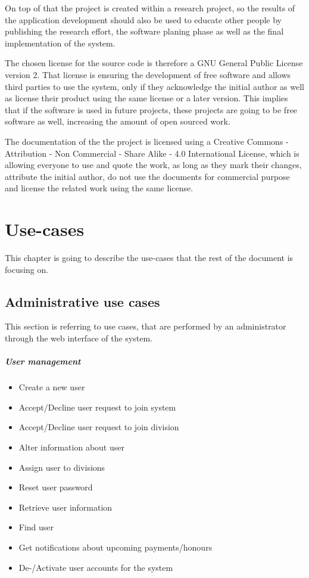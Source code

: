 On top of that the project is created within a research project, so the results of the application development should also be used to educate other people by publishing the research effort, the software planing phase as well as the final implementation of the system.

The chosen license for the source code is therefore a GNU General Public License version 2. That license is ensuring the development of free software and allows third parties to use the system, only if they acknowledge the initial author as well as license their product using the same license or a later version. This implies that if the software is used in future projects, these projects are going to be free software as well, increasing the amount of open sourced work.

The documentation of the the project is licensed using a Creative Commons - Attribution - Non Commercial - Share Alike - 4.0 International License, which is allowing everyone to use and quote the work, as long as they mark their changes, attribute the initial author, do not use the documents for commercial purpose and license the related work using the same license.

\chapter{Use-cases}
This chapter is going to describe the use-cases that the rest of the document is focusing on.

\section{Administrative use cases}
This section is referring to use cases, that are performed by an administrator through the web interface of the system.
\paragraph{User management}
\begin{itemize}
\item Create a new user
\item Accept/Decline user request to join system
\item Accept/Decline user request to join division
\item Alter information about user
\item Assign user to divisions
\item Reset user password
\item Retrieve user information
\item Find user
\item Get notifications about upcoming payments/honours
\item De-/Activate user accounts for the system
\end{itemize}


